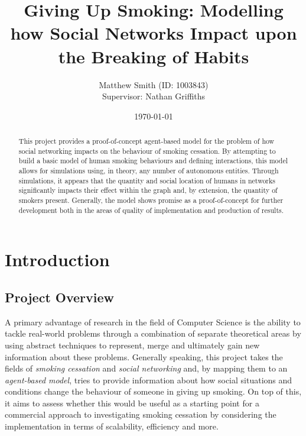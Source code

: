 \documentclass[]{report}
\begin{document}
\linespread{1.3}

\title{Giving Up Smoking: Modelling how Social Networks Impact upon the Breaking of Habits}
\author{Matthew Smith (ID: 1003843) \\ Supervisor: Nathan Griffiths}
\date{\today}
\maketitle
\begin{abstract}
This project provides a proof-of-concept agent-based model for the problem of how social networking impacts on the behaviour of smoking cessation. By attempting to build a basic model of human smoking behaviours and defining interactions, this model allows for  simulations using, in theory, any number of autonomous entities. Through simulations, it appears that the quantity and social location of humans in networks significantly impacts their effect within the graph and, by extension, the quantity of smokers present. Generally, the model shows promise as a proof-of-concept for further development both in the areas of quality of implementation and production of results.
\end{abstract}

\tableofcontents

%
%
\chapter{Introduction}

\section{Project Overview}
A primary advantage of research in the field of Computer Science is the ability to tackle real-world problems through a combination of separate theoretical areas by using abstract techniques to represent, merge and ultimately gain new information about these problems. Generally speaking, this project takes the fields of \emph{smoking cessation} and \emph{social networking} and, by mapping them to an \emph{agent-based model}, tries to provide information about how social situations and conditions change the behaviour of someone in giving up smoking. On top of this, it aims to assess whether this would be useful as a starting point for a commercial approach to investigating smoking cessation by considering the implementation in terms of scalability, efficiency and more. 
\end{document}
